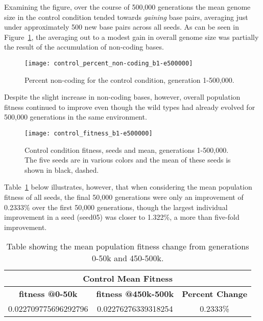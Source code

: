Examining the figure, over the course of 500,000 generations the mean genome size in the control condition tended towards \textit{gaining} base pairs, averaging just under approximately 500 new base pairs across all seeds. As can be seen in Figure~\ref{fig:control_perc_non-coding}, the averaging out to a modest gain in overall genome size was partially the result of the accumulation of non-coding bases.

\begin{figure}[H]
	\texttt{[image: control\_percent\_non-coding\_b1-e500000]}
	\caption[Control condition percent non-coding]{Percent non-coding for the control condition, generation 1-500,000.}
	\label{fig:control_perc_non-coding}
\end{figure}
Despite the slight increase in non-coding bases, however, overall population fitness continued to improve even though the wild types had already evolved for 500,000 generations in the same environment.

\begin{figure}[H]
	\texttt{[image: control\_fitness\_b1-e500000]}
	\caption[Control condition fitness]{Control condition fitness, seeds and mean, generations 1-500,000. The five seeds are in various colors and the mean of these seeds is shown in black, dashed.}
	\label{fig:control_fitness}
\end{figure}

Table~\ref{table:control_mean_fitness_change} below illustrates, however, that when considering the mean population fitness of all seeds, the final 50,000 generations were only an improvement of 0.2333\% over the first 50,000 generations, though the largest individual improvement in a seed (seed05) was closer to 1.322\%, a more than five-fold improvement.  

\begin{table}[H]
	\centering
	\begin{tabular}{|c|c|c|}
		\hline
		\multicolumn{3}{|c|}{\Large \textbf{Control Mean Fitness}} \\
		\hline
		\textbf{fitness @0-50k} & \textbf{fitness @450k-500k} & \textbf{Percent Change} \\
		\hline \hline
		0.022709775696292796 & 0.02276276339318254 & 0.2333\%  \\
		\hline
		
	\end{tabular}
	\caption[Control Population Mean Fitness, Gens 0-50k, 450k-500k]{Table showing the mean population fitness change from generations 0-50k and 450-500k.}
	\label{table:control_mean_fitness_change}
\end{table}


